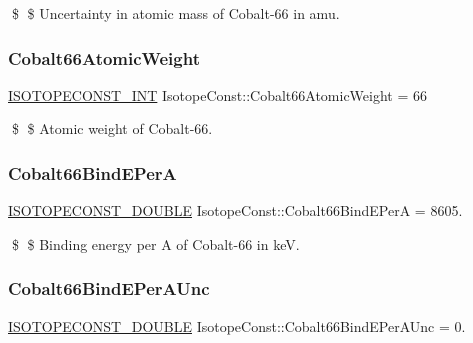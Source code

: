 \$ \$ Uncertainty in atomic mass of Cobalt-\/66 in amu. \mbox{\label{group___isotope_const-_cobalt-_co66_ga8c07a41896d436ac348195516a393fbb}} 
\subsubsection{\texorpdfstring{Cobalt66\+Atomic\+Weight}{Cobalt66AtomicWeight}}
{\footnotesize\ttfamily \mbox{\hyperlink{group___isotope_const-_macros_ga5f18360b3e99483a35c32d789e62621c}{I\+S\+O\+T\+O\+P\+E\+C\+O\+N\+S\+T\+\_\+\+I\+NT}} Isotope\+Const\+::\+Cobalt66\+Atomic\+Weight = 66}

\$ \$ Atomic weight of Cobalt-\/66. \mbox{\label{group___isotope_const-_cobalt-_co66_ga42f553a4d27efc01f789ba5aaa490f1d}} 
\subsubsection{\texorpdfstring{Cobalt66\+Bind\+E\+PerA}{Cobalt66BindEPerA}}
{\footnotesize\ttfamily \mbox{\hyperlink{group___isotope_const-_macros_ga8f45a7272ce02c0b4c65c44636ed719a}{I\+S\+O\+T\+O\+P\+E\+C\+O\+N\+S\+T\+\_\+\+D\+O\+U\+B\+LE}} Isotope\+Const\+::\+Cobalt66\+Bind\+E\+PerA = 8605.}

\$ \$ Binding energy per A of Cobalt-\/66 in keV. \mbox{\label{group___isotope_const-_cobalt-_co66_gab5572f48324955ad1c8be15815c994ad}} 
\subsubsection{\texorpdfstring{Cobalt66\+Bind\+E\+Per\+A\+Unc}{Cobalt66BindEPerAUnc}}
{\footnotesize\ttfamily \mbox{\hyperlink{group___isotope_const-_macros_ga8f45a7272ce02c0b4c65c44636ed719a}{I\+S\+O\+T\+O\+P\+E\+C\+O\+N\+S\+T\+\_\+\+D\+O\+U\+B\+LE}} Isotope\+Const\+::\+Cobalt66\+Bind\+E\+Per\+A\+Unc = 0.}

